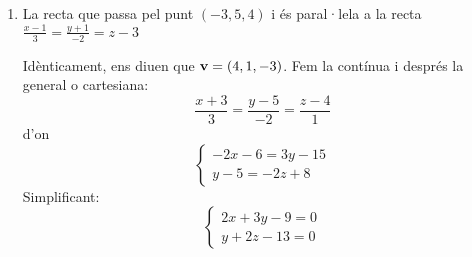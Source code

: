 \begin{enumerate}
    \item La recta que passa pel punt $(-3,5,4)$ i és paral·lela a la recta $\frac{x-1}{3}=\frac{y+1}{-2}=z-3$

 Idènticament, ens diuen que $\textbf{v}=(4,1,-3)$. Fem la contínua i després la general o cartesiana:
 \[
 \frac{x+3}{3}=\frac{y-5}{-2}=\frac{z-4}{1}
 \]
 d'on
 \[
 \begin{cases}-2x-6=3y-15\\y-5=-2z+8\end{cases}
 \]
 Simplificant:
 \[
 \begin{cases}2x+3y-9=0\\y+2z-13=0\end{cases}
 \]
 \blacksquare


\end{enumerate}
